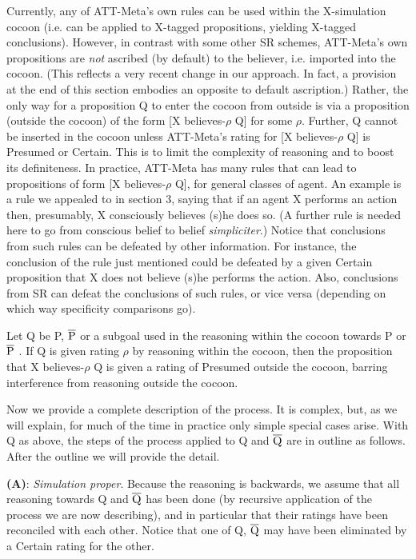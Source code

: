 Currently, any of ATT-Meta's own rules can be used within the X-simulation
cocoon (i.e. can be applied to X-tagged propositions, yielding X-tagged
conclusions).  However, in contrast with some other SR schemes, ATT-Meta's own
propositions are {\it not} ascribed (by default) to the believer, i.e. imported
into the cocoon.  (This reflects a very recent change in our approach. In fact,
a provision at the end of this section embodies an opposite to default
ascription.)  Rather, the only way for a proposition Q to enter the cocoon
from outside is via a proposition (outside the cocoon) of the form [X
believes-$\rho$ Q] for some $\rho$.  Further, Q cannot be inserted in the
cocoon unless ATT-Meta's rating for [X believes-$\rho$ Q] is Presumed or
Certain. This is to limit the complexity of reasoning and to boost its
definiteness.  In practice, ATT-Meta has many rules that can lead to
propositions of form [X believes-$\rho$ Q], for general classes of agent. An
example is a rule we appealed to in section 3, saying that if an agent X
performs an action then, presumably, X consciously believes (s)he does so. (A
further rule is needed here to go from conscious belief to belief {\it
simpliciter}.) Notice that conclusions from such rules can be defeated by other
information. For instance, the conclusion of the rule just mentioned could be
defeated by a given Certain proposition that X does not believe (s)he performs
the action.  Also, conclusions from SR can defeat the conclusions of such
rules, or vice versa (depending on which way specificity comparisons go).

Let Q be P, $\overline{{\rm P}}$ or a subgoal used in the reasoning within the
cocoon towards P or $\overline{{\rm P}}$ .  If Q is given rating $\rho$ by
reasoning within the cocoon, then the proposition that X believes-$\rho$ Q is
given a rating of Presumed outside the cocoon, barring interference from
reasoning outside the cocoon.

Now we provide a complete description of the process. It is
complex, but, as we will explain, for much of the time in practice only simple
special cases arise.  With Q as above, the steps of the process applied to Q
and $\overline{{\rm Q}}$ are in outline as follows. After the outline we will
provide the detail.

{\bf (A)}: {\it Simulation proper}. Because the reasoning is backwards, we assume
that all reasoning towards Q and $\overline{{\rm Q}}$ has been done (by
recursive application of the process we are now describing), and in particular
that their ratings have been reconciled with each other.  Notice that one of Q,
$\overline{{\rm Q}}$ may have been eliminated by a Certain rating for the
other.


